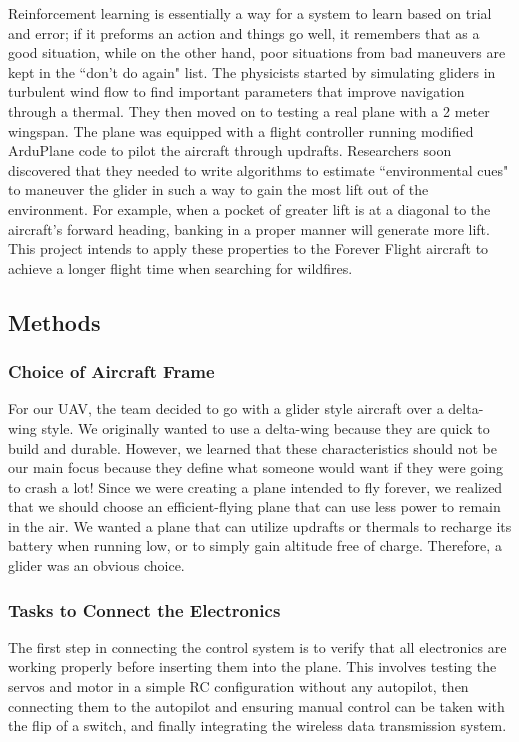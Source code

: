 \documentclass[12pt,journal,compsoc]{IEEEtran}
\begin{document}
Reinforcement learning is essentially a way for a system to learn based on trial and error; if it preforms an action and things go well, it remembers that as a good situation, while on the other hand, poor situations from bad maneuvers are kept in the ``don't do again" list. The physicists started by simulating gliders in turbulent wind flow to find important parameters that improve navigation through a thermal. They then moved on to testing a real plane with a 2 meter wingspan. The plane was equipped with a flight controller running modified ArduPlane code to pilot the aircraft through updrafts. Researchers soon discovered that they needed to write algorithms to estimate ``environmental cues" to maneuver the glider in such a way to gain the most lift out of the environment. For example, when a pocket of greater lift is at a diagonal to the aircraft's forward heading, banking in a proper manner will generate more lift. This project intends to apply these properties to the Forever Flight aircraft to achieve a longer flight time when searching for wildfires.

\subsection{Methods}
\subsubsection{Choice of Aircraft Frame}
For our UAV, the team decided to go with a glider style aircraft over a delta-wing style. We originally wanted to use a delta-wing because they are quick to build and durable. However, we learned that these characteristics should not be our main focus because they define what someone would want if they were going to crash a lot! Since we were creating a plane intended to fly forever, we realized that we should choose an efficient-flying plane that can use less power to remain in the air. We wanted a plane that can utilize updrafts or thermals to recharge its battery when running low, or to simply gain altitude free of charge. Therefore, a glider was an obvious choice.
\subsubsection{Tasks to Connect the Electronics}
The first step in connecting the control system is to verify that all electronics are working properly before inserting them into the plane. This involves testing the servos and motor in a simple RC configuration without any autopilot, then connecting them to the autopilot and ensuring manual control can be taken with the flip of a switch, and finally integrating the wireless data transmission system.
\end{document}
